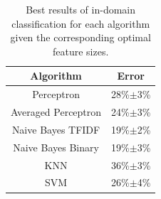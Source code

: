 \begin{table}[h!]
	\centering
	\begin{tabular}{ | c | c | } \hline
	\textbf{Algorithm} & \textbf{Error} \\ \hline
	Perceptron & 28\%$\pm$3\% \\ \hline
	Averaged Perceptron & 24\%$\pm$3\% \\ \hline
	Naive Bayes TFIDF & 19\%$\pm$2\% \\ \hline
	Naive Bayes Binary & 19\%$\pm$3\% \\ \hline
	KNN & 36\%$\pm$3\% \\ \hline
	SVM & 26\%$\pm$4\% \\ \hline
	\end{tabular}
	\caption{Best results of in-domain classification for each algorithm given the corresponding optimal feature sizes.}
	\label{tab:algorithm_best_performance}
\end{table}
